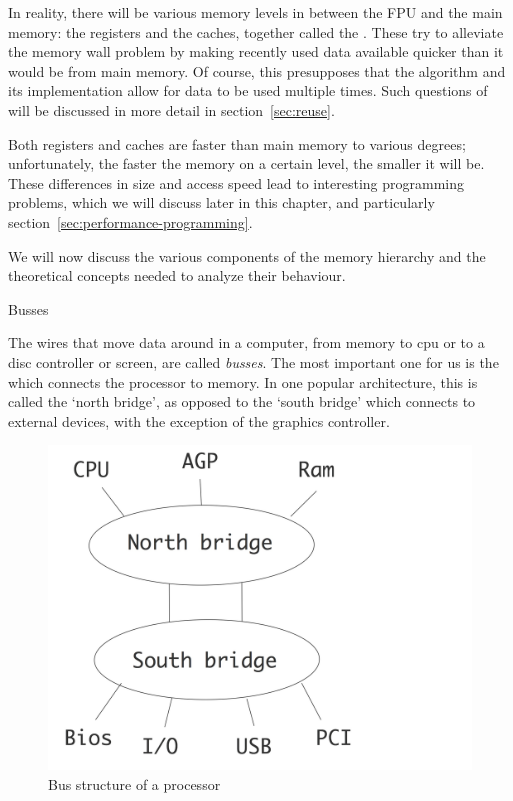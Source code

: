 In reality, there will be various memory levels in between the
\ac{FPU} and the main memory: the registers
and the caches, together called the
. These try to alleviate the memory
wall problem by making recently used data available quicker than it
would be from main memory. Of course, this presupposes that the
algorithm and its implementation allow for data to be used multiple
times.  Such questions of  will be discussed in
more detail in section~\ref{sec:reuse}.

Both registers and caches are faster
than main memory to various degrees; unfortunately, the faster the memory on a certain
level, the smaller it will be.
These differences in size and access speed lead to interesting programming
problems, which we will discuss later in this chapter, and
particularly section~\ref{sec:performance-programming}.

We will now discuss the various components of the memory hierarchy and
the theoretical concepts needed to analyze their behaviour.

 {Busses}

The wires that move data around in a computer, from memory to cpu or
to a disc controller or screen, are called \emph{busses}. The
most important one for us is the  which connects the processor to memory. In one popular
architecture, this is called the `north bridge', as opposed to the
`south bridge' which connects to external devices, with the exception
of the graphics controller.

\begin{figure}[ht]
\includegraphics[scale=.1]{graphics-public/bridges}
\caption{Bus structure of a processor}
\end{figure}

